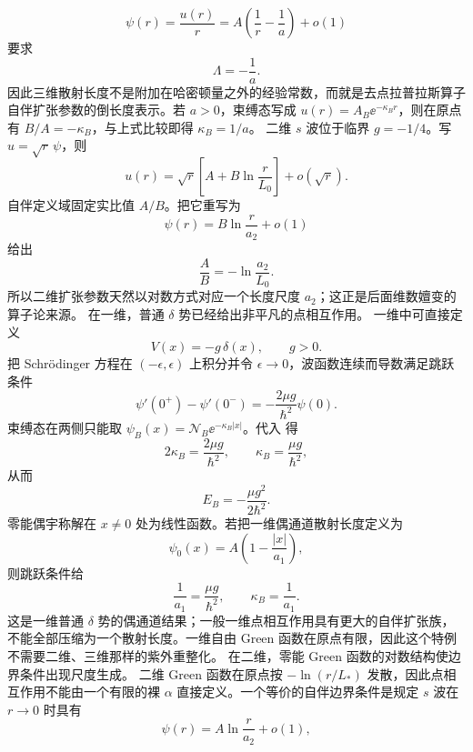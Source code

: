 \[
\psi(r)=\frac{u(r)}r
=A\left(\frac1r-\frac1a\right)+o(1)
\]
要求
\begin{equation}
\Lambda=-\frac1a.
\label{eq:phys-hdqm-extension-scattering-length-3d}
\end{equation}
因此三维散射长度不是附加在哈密顿量之外的经验常数，而就是去点拉普拉斯算子自伴扩张参数的倒长度表示。若 $a>0$，束缚态写成 $u(r)=A_B\ee^{-\kappa_Br}$，则在原点有 $B/A=-\kappa_B$，与上式比较即得 $\kappa_B=1/a$。
二维 $s$ 波位于临界 $g=-1/4$。写 $u=\sqrt r\,\psi$，则
\[
u(r)=\sqrt r\left[A+B\ln\frac r{L_0}\right]+o(\sqrt r).
\]
自伴定义域固定实比值 $A/B$。把它重写为
\[
\psi(r)=B\ln\frac r{a_2}+o(1)
\]
给出
\begin{equation}
\frac AB=-\ln\frac{a_2}{L_0}.
\label{eq:phys-hdqm-extension-scattering-length-2d}
\end{equation}
所以二维扩张参数天然以对数方式对应一个长度尺度 $a_2$；这正是后面维数嬗变的算子论来源。
在一维，普通 $\delta$ 势已经给出非平凡的点相互作用。
一维中可直接定义
\[
V(x)=-g\,\delta(x),\qquad g>0.
\]
把 Schrödinger 方程在 $(-\epsilon,\epsilon)$ 上积分并令 $\epsilon\to0$，波函数连续而导数满足跳跃条件
\begin{equation}
\psi'(0^+)-\psi'(0^-)
=-\frac{2\mu g}{\hbar^2}\psi(0).
\label{eq:phys-hdqm-delta-1d-jump}
\end{equation}
束缚态在两侧只能取 $\psi_B(x)=\mathcal N_B\ee^{-\kappa_B|x|}$。代入 得
\[
2\kappa_B=\frac{2\mu g}{\hbar^2},
\qquad
\kappa_B=\frac{\mu g}{\hbar^2},
\]
从而
\begin{equation}
E_B=-\frac{\mu g^2}{2\hbar^2}.
\label{eq:phys-hdqm-delta-1d-bound-energy}
\end{equation}
零能偶宇称解在 $x\ne0$ 处为线性函数。若把一维偶通道散射长度定义为
\[
\psi_0(x)=A\left(1-\frac{|x|}{a_1}\right),
\]
则跳跃条件给
\begin{equation}
\frac1{a_1}=\frac{\mu g}{\hbar^2},
\qquad
\kappa_B=\frac1{a_1}.
\label{eq:phys-hdqm-extension-scattering-length-1d}
\end{equation}
这是一维普通 $\delta$ 势的偶通道结果；一般一维点相互作用具有更大的自伴扩张族，不能全部压缩为一个散射长度。一维自由 Green 函数在原点有限，因此这个特例不需要二维、三维那样的紫外重整化。
在二维，零能 Green 函数的对数结构使边界条件出现尺度生成。
二维 Green 函数在原点按 $-\ln(r/L_*)$ 发散，因此点相互作用不能由一个有限的裸 $\alpha$ 直接定义。一个等价的自伴边界条件是规定 $s$ 波在 $r\to0$ 时具有
\begin{equation}
\psi(r)=A\ln\frac{r}{a_2}+o(1),
\label{eq:phys-hdqm-point-2d-boundary}
\end{equation}
